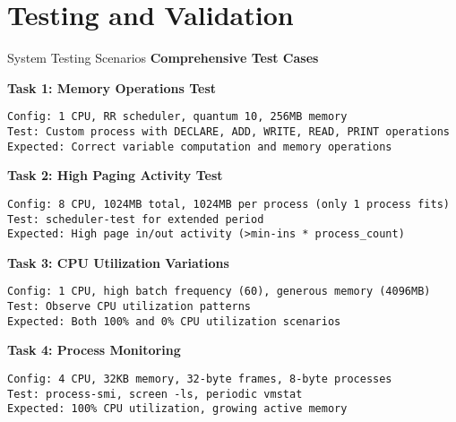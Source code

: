 \documentclass[10pt]{beamer}
\begin{document}
\section{Testing and Validation}

\begin{frame}[fragile]{System Testing Scenarios}
    \textbf{Comprehensive Test Cases}
    
    \textbf{Task 1: Memory Operations Test}
    \begin{lstlisting}[basicstyle=\ttfamily\tiny]
Config: 1 CPU, RR scheduler, quantum 10, 256MB memory
Test: Custom process with DECLARE, ADD, WRITE, READ, PRINT operations
Expected: Correct variable computation and memory operations
    \end{lstlisting}
    
    \textbf{Task 2: High Paging Activity Test}
    \begin{lstlisting}[basicstyle=\ttfamily\tiny]
Config: 8 CPU, 1024MB total, 1024MB per process (only 1 process fits)
Test: scheduler-test for extended period
Expected: High page in/out activity (>min-ins * process_count)
    \end{lstlisting}
    
    \textbf{Task 3: CPU Utilization Variations}
    \begin{lstlisting}[basicstyle=\ttfamily\tiny]
Config: 1 CPU, high batch frequency (60), generous memory (4096MB)
Test: Observe CPU utilization patterns
Expected: Both 100% and 0% CPU utilization scenarios
    \end{lstlisting}
    
    \textbf{Task 4: Process Monitoring}
    \begin{lstlisting}[basicstyle=\ttfamily\tiny]
Config: 4 CPU, 32KB memory, 32-byte frames, 8-byte processes
Test: process-smi, screen -ls, periodic vmstat
Expected: 100% CPU utilization, growing active memory
    \end{lstlisting}
\end{frame}
\end{document}
